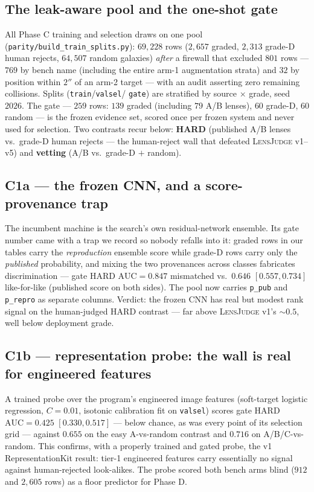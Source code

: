 \documentclass[11pt,letterpaper]{article}
\newcommand{\lj}{\textsc{LensJudge}}
\begin{document}
\subsection{The leak-aware pool and the one-shot gate}\label{sec:pool}
All Phase C training and selection draws on one pool
(\texttt{parity/build\_train\_splits.py}): $69{,}228$ rows ($2{,}657$ graded,
$2{,}313$ grade-D human rejects, $64{,}507$ random galaxies) \emph{after} a firewall
that excluded $801$ rows --- $769$ by bench name (including the entire arm-1
augmentation strata) and $32$ by position within $2''$ of an arm-2 target --- with an
audit asserting zero remaining collisions. Splits (\texttt{train}/\texttt{valsel}/%
\texttt{gate}) are stratified by source $\times$ grade, seed $2026$. The gate --- $259$
rows: $139$ graded (including $79$ A/B lenses), $60$ grade-D, $60$ random --- is the
frozen evidence set, scored once per frozen system and never used for selection. Two
contrasts recur below: \textbf{HARD} (published A/B lenses vs.\ grade-D human rejects
--- the human-reject wall that defeated \lj{} v1--v5) and \textbf{vetting} (A/B vs.\
grade-D $+$ random).

\subsection{C1a --- the frozen CNN, and a score-provenance trap}\label{sec:cnn}
The incumbent machine is the search's own residual-network ensemble. Its gate number
came with a trap we record so nobody refalls into it: graded rows in our tables carry
the \emph{reproduction} ensemble score while grade-D rows carry only the
\emph{published} probability, and mixing the two provenances across classes fabricates
discrimination --- gate HARD $\mathrm{AUC}=0.847$ mismatched vs.\ $\mathbf{0.646}$
$[0.557,0.734]$ like-for-like (published score on both sides). The pool now carries
\texttt{p\_pub} and \texttt{p\_repro} as separate columns. Verdict: the frozen CNN has
real but modest rank signal on the human-judged HARD contrast --- far above \lj{} v1's
${\sim}0.5$, well below deployment grade.

\subsection{C1b --- representation probe: the wall is real for engineered features}
\label{sec:rep}
A trained probe over the program's engineered image features (soft-target logistic
regression, $C=0.01$, isotonic calibration fit on \texttt{valsel}) scores gate HARD
$\mathrm{AUC}=0.425$ $[0.330,0.517]$ --- below chance, as was every point of its
selection grid --- against $0.655$ on the easy A-vs-random contrast and $0.716$ on
A/B/C-vs-random. This confirms, with a properly trained and gated probe, the v1
RepresentationKit result: tier-1 engineered features carry essentially no signal
against human-rejected look-alikes. The probe scored both bench arms blind
($912$ and $2{,}605$ rows) as a floor predictor for Phase D.
\end{document}
